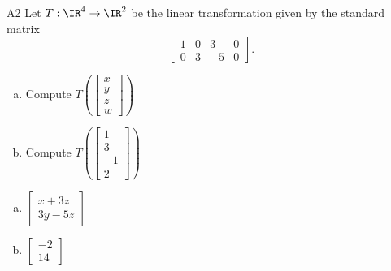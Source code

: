 \begin{problem}{A2}
Let $T: \IR^4 \rightarrow \IR^2$ be the linear transformation given by the standard matrix
$$\begin{bmatrix} 1 & 0 & 3 & 0 \\ 0 & 3 & -5 & 0 \end{bmatrix}.$$
\begin{enumerate}[(a)]
\item Compute \( T\left( \begin{bmatrix}x\\ y \\ z \\ w \end{bmatrix} \right) \)
\item Compute \( T\left( \begin{bmatrix} 1 \\ 3 \\ -1 \\ 2\end{bmatrix} \right) \)
\end{enumerate}
\end{problem}
\begin{solution}
\begin{enumerate}[(a)]
\item \(\begin{bmatrix}x+3z \\ 3y-5z \end{bmatrix}\)
\item \(\begin{bmatrix} -2 \\ 14 \end{bmatrix}\)
\end{enumerate}
\end{solution}

